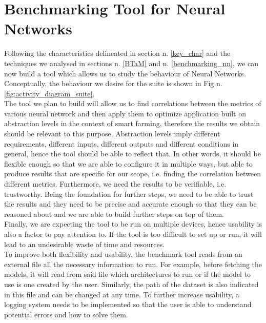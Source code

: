 






\section{Benchmarking Tool for Neural Networks }\label{sec:my_bench}
Following the characteristics delineated in section n. \ref{key_char} and the techniques we analysed in sections n. \ref{BTaM} and n. \ref{benchmarking_nn}, we can now build a tool which allows us to study the behaviour of Neural Networks. Conceptually, the behaviour we desire for the suite is shown in Fig n. \ref{fig:activity_diagram_suite}. \\
The tool we plan to build will allow us to find correlations between the metrics of various neural network and then apply them to optimize application built on abstraction levels in the context of smart farming, therefore the results we obtain should be relevant to this purpose. Abstraction levels imply different requirements, different inputs, different outputs and different conditions in general, hence the tool should be able to reflect that. In other words, it should be flexible enough so that we are able to configure it in multiple ways, but able to produce results that are specific for our scope, i.e. finding the correlation between different metrics. Furthermore, we need the results to be verifiable, i.e. trustworthy. Being the foundation for further steps, we need to be able to trust the results and they need to be precise and accurate enough so that they can be reasoned about and we are able to build further steps on top of them.\\
Finally, we are expecting the tool to be run on multiple devices, hence usability is also a factor to pay attention to. If the tool is too difficult to set up or run, it will lead to an undesirable waste of time and resources. \\

To improve both flexibility and usability, the benchmark tool reads from an external file all the necessary information to run. For example, before fetching the models, it will read from said file which architectures to run or if the model to use is one created by the user. Similarly, the path of the dataset is also indicated in this file and can be changed at any time. To further increase usability, a logging system needs to be implemented so that the user is able to understand potential errors and how to solve them. 


